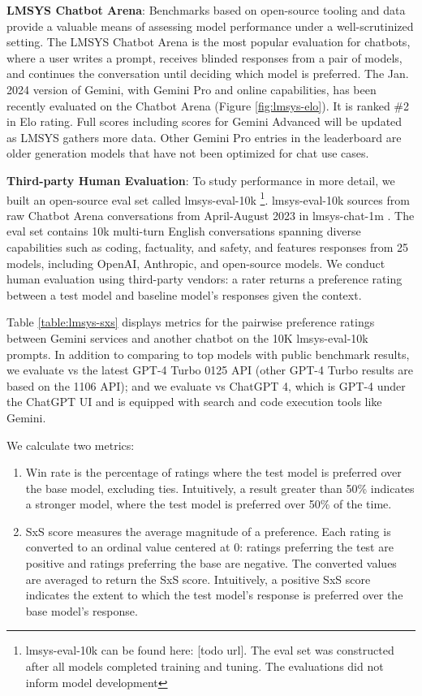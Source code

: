 \textbf{LMSYS Chatbot Arena}: Benchmarks based on open-source tooling and data provide a valuable means of assessing model performance under a well-scrutinized setting. The LMSYS Chatbot Arena \citep{lmsys} is the most popular evaluation for chatbots, where a user writes a prompt, receives blinded responses from a pair of models, and continues the conversation until deciding which model is preferred. The Jan. 2024 version of Gemini, with Gemini Pro and online capabilities, has been recently evaluated on the Chatbot Arena (Figure \ref{fig:lmsys-elo}). It is ranked \#2 in Elo rating. Full scores including scores for Gemini Advanced will be updated as LMSYS gathers more data. Other Gemini Pro entries in the leaderboard are older generation models that have not been optimized for chat use cases.

\textbf{Third-party Human Evaluation}: To study performance in more detail, we built an open-source eval set called lmsys-eval-10k \footnote{lmsys-eval-10k can be found here: [todo url]. The eval set was constructed after all models completed training and tuning. The evaluations did not inform model development}. lmsys-eval-10k sources from raw Chatbot Arena conversations from April-August 2023 in lmsys-chat-1m \citep{zheng2023lmsys}. The eval set contains 10k multi-turn English conversations spanning diverse capabilities such as coding, factuality, and safety, and features responses from 25 models, including OpenAI, Anthropic, and open-source models. We conduct human evaluation using third-party vendors: a rater returns a preference rating between a test model and baseline model’s responses given the context.

Table \ref{table:lmsys-sxs} displays metrics for the pairwise preference ratings between Gemini services and another chatbot on the 10K lmsys-eval-10k prompts. In addition to comparing to top models with public benchmark results, we evaluate vs the latest GPT-4 Turbo 0125 API (other GPT-4 Turbo results are based on the 1106 API); and we evaluate vs ChatGPT 4, which is GPT-4 under the ChatGPT UI and is equipped with search and code execution tools like Gemini.

We calculate two metrics:

\begin{enumerate}
\item Win rate is the percentage of ratings where the test model is preferred over the base model, excluding ties. Intuitively, a result greater than 50\% indicates a stronger model, where the test model is preferred over 50\% of the time.\\
\item SxS score measures the average magnitude of a preference. Each rating is converted to an ordinal value centered at 0: ratings preferring the test are positive and ratings preferring the base are negative. The converted values are averaged to return the SxS score. Intuitively, a positive SxS score indicates the extent to which the test model’s response is preferred over the base model’s response.
\end{enumerate}

